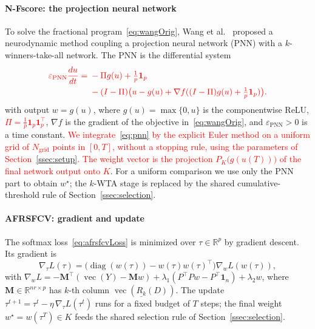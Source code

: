 \documentclass[]{interact}
\theoremstyle{plain}
\theoremstyle{definition}
\theoremstyle{remark}
\newcommand{\R}{\mathbb{R}}
\DeclareMathOperator{\diag}{diag}
\DeclareMathOperator{\vecop}{vec}
\begin{document}
\paragraph*{N-Fscore: the projection neural network}
To solve the fractional program~\eqref{eq:wangOrig}, Wang et al.~\citep{wang2021fractional} proposed a neurodynamic method coupling a projection neural network (PNN) with a $k$-winners-take-all network. The PNN is the differential system
\begin{equation}\label{eq:pnn}\textcolor{red}{
\begin{split}\varepsilon_{\mathrm{PNN}}\frac{du}{dt}={}&-\Pi g(u)+\tfrac1p\mathbf{1}_p\\&-(I-\Pi)\bigl(u-g(u)+\nabla f((I-\Pi)g(u)+\tfrac1p\mathbf{1}_p)\bigr).\end{split}
}\end{equation}
with output $w=g(u)$, where $g(u)=\max\{0,u\}$ is the componentwise ReLU, \leavevmode\textcolor{red}{$\Pi=\tfrac1p\mathbf{1}_p\mathbf{1}_p^{\top}$}, $\nabla f$ is the gradient of the objective in~\eqref{eq:wangOrig}, and $\varepsilon_{\mathrm{PNN}}>0$ is a time constant. \leavevmode\textcolor{red}{We integrate~\eqref{eq:pnn} by the explicit Euler method on a uniform grid of $N_{\mathrm{grid}}$ points in $[0,T]$, without a stopping rule, using the parameters of Section~\ref{ssec:setup}. The weight vector is the projection $P_K\bigl(g(u(T))\bigr)$ of the final network output onto $K$}. For a uniform comparison we use only the PNN part to obtain $w^\star$; the $k$-WTA stage is replaced by the shared cumulative-threshold rule of Section~\ref{ssec:selection}.

\paragraph*{AFRSFCV: gradient and update}
The softmax loss~\eqref{eq:afrsfcvLoss} is minimized over $\tau\in\R^p$ by gradient descent. Its gradient is
\begin{equation}\label{eq:gradTau}
\nabla_\tau L(\tau)=\bigl(\diag(w(\tau))-w(\tau)w(\tau)^{\top}\bigr)\nabla_w L(w(\tau)),
\end{equation}
with $\nabla_w L=-\mathbf{M}^{\top}(\vecop(Y)-\mathbf{M}w)+\lambda_1(P^{\top}Pw-P^{\top}\mathbf{1}_n)+\lambda_2 w$, where $\mathbf{M}\in\R^{nr\times p}$ has $k$-th column $\vecop(\underline{R_k}(D))$. The update $\tau^{t+1}=\tau^t-\eta\,\nabla_\tau L(\tau^t)$ runs for a fixed budget of $T$ steps; the final weight $w^\star=w(\tau^T)\in K$ feeds the shared selection rule of Section~\ref{ssec:selection}.
\end{document}
